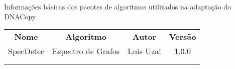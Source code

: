 
\begin{quadro}[h]
 \centering
 \caption{Informações básicas dos pacotes de algoritmos utilizados na adaptação do DNACopy\label{qua:quadro-2-algoritmos}}
 {\renewcommand\arraystretch{1.25}
 \begin{tabular}{ l l l l }
  \cline{1-1}\cline{2-2}\cline{3-3}\cline{4-4}  
    \multicolumn{1}{|c|}{\textbf{Nome} \centering } &
    \multicolumn{1}{c|}{\textbf{Algoritmo} \centering } &
    \multicolumn{1}{c|}{\textbf{Autor} \centering } &
    \multicolumn{1}{c|}{\textbf{Versão} \centering }
  \\  
  \cline{1-1}\cline{2-2}\cline{3-3}\cline{4-4}  
    \multicolumn{1}{|c|}{SpecDetec} &
    \multicolumn{1}{c|}{Espectro de Grafos} &
    \multicolumn{1}{c|}{Luis Uzai} &
    \multicolumn{1}{c|}{1.0.0}
  \\  
  \cline{1-1}\cline{2-2}\cline{3-3}\cline{4-4}  
    \multicolumn{1}{|c|}{ } &
    \multicolumn{1}{c|}{ } &
    \multicolumn{1}{c|}{ } &
    \multicolumn{1}{c|}{ }
  \\  
  \cline{1-1}\cline{2-2}\cline{3-3}\cline{4-4}  
    \multicolumn{1}{|c|}{ } &
    \multicolumn{1}{c|}{ } &
    \multicolumn{1}{c|}{ } &
    \multicolumn{1}{c|}{ }
  \\  
  \hline

 \end{tabular}
 }
\end{quadro}